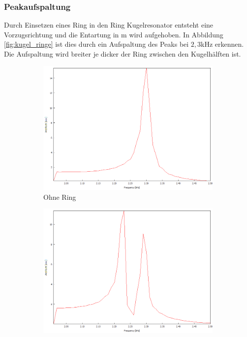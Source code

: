 \subsubsection{Peakaufspaltung}
Durch Einsetzen eines Ring in den Ring Kugelresonator entsteht eine Vorzugsrichtung und die Entartung in m wird aufgehoben.
In Abbildung \ref{fig:kugel_ringe} ist dies durch ein Aufspaltung des Peaks bei $2,3$kHz erkennen.
Die Aufspaltung wird breiter je dicker der Ring zwischen den Kugelhälften ist.
\begin{figure}
  \centering
  \begin{subfigure}{0.4\textwidth}
    \centering
    \includegraphics[width=\textwidth]{Bilder/PC_Kugelresonator/180_2000-2500_ohneRing.png}
    \caption{Ohne Ring}
  \end{subfigure}
  \begin{subfigure}{0.4\textwidth}
    \centering
    \includegraphics[width=\textwidth]{Bilder/PC_Kugelresonator/180_2000-2500_3mmRing.png}

\end{subfigure}
\end{figure}
